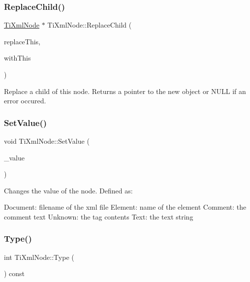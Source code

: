\subsubsection{\texorpdfstring{Replace\+Child()}{ReplaceChild()}}
{\footnotesize\ttfamily \hyperlink{class_ti_xml_node}{Ti\+Xml\+Node} $\ast$ Ti\+Xml\+Node\+::\+Replace\+Child (\begin{DoxyParamCaption}\item[{\hyperlink{class_ti_xml_node}{Ti\+Xml\+Node} $\ast$}]{replace\+This,  }\item[{const \hyperlink{class_ti_xml_node}{Ti\+Xml\+Node} \&}]{with\+This }\end{DoxyParamCaption})}

Replace a child of this node. Returns a pointer to the new object or N\+U\+LL if an error occured. \hypertarget{class_ti_xml_node_a2a38329ca5d3f28f98ce932b8299ae90}{}\label{class_ti_xml_node_a2a38329ca5d3f28f98ce932b8299ae90} 
\subsubsection{\texorpdfstring{Set\+Value()}{SetValue()}}
{\footnotesize\ttfamily void Ti\+Xml\+Node\+::\+Set\+Value (\begin{DoxyParamCaption}\item[{const char $\ast$}]{\+\_\+value }\end{DoxyParamCaption})\hspace{0.3cm}{\ttfamily [inline]}}

Changes the value of the node. Defined as\+: \begin{DoxyVerb}Document:   filename of the xml file
Element:    name of the element
Comment:    the comment text
Unknown:    the tag contents
Text:       the text string
\end{DoxyVerb}
 \hypertarget{class_ti_xml_node_a0f4dd916b2afc2ab2f1a84f3e2b8fd5d}{}\label{class_ti_xml_node_a0f4dd916b2afc2ab2f1a84f3e2b8fd5d} 
\subsubsection{\texorpdfstring{Type()}{Type()}}
{\footnotesize\ttfamily int Ti\+Xml\+Node\+::\+Type (\begin{DoxyParamCaption}{ }\end{DoxyParamCaption}) const\hspace{0.3cm}{\ttfamily [inline]}}

